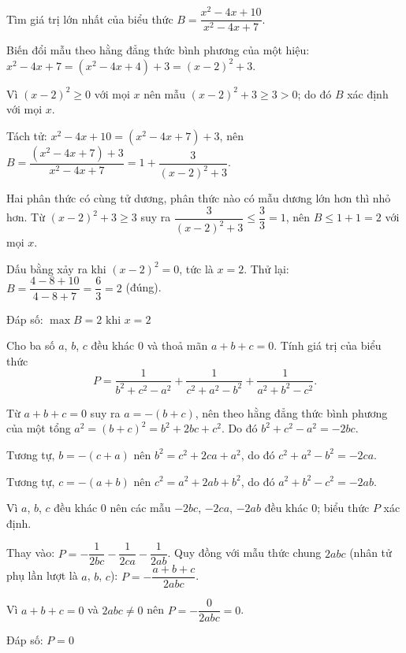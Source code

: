 \begin{problem}[8DS-PS-019]
Tìm giá trị lớn nhất của biểu thức $B = \dfrac{x^2 - 4x + 10}{x^2 - 4x + 7}$.

\begin{solution}
Biến đổi mẫu theo hằng đẳng thức bình phương của một hiệu: $x^2 - 4x + 7 = (x^2 - 4x + 4) + 3 = (x - 2)^2 + 3$.

Vì $(x - 2)^2 \geq 0$ với mọi $x$ nên mẫu $(x - 2)^2 + 3 \geq 3 > 0$; do đó $B$ xác định với mọi $x$.

Tách tử: $x^2 - 4x + 10 = (x^2 - 4x + 7) + 3$, nên $B = \dfrac{(x^2 - 4x + 7) + 3}{x^2 - 4x + 7} = 1 + \dfrac{3}{(x - 2)^2 + 3}$.

Hai phân thức có cùng tử dương, phân thức nào có mẫu dương lớn hơn thì nhỏ hơn. Từ $(x - 2)^2 + 3 \geq 3$ suy ra $\dfrac{3}{(x - 2)^2 + 3} \leq \dfrac{3}{3} = 1$, nên $B \leq 1 + 1 = 2$ với mọi $x$.

Dấu bằng xảy ra khi $(x - 2)^2 = 0$, tức là $x = 2$. Thử lại: $B = \dfrac{4 - 8 + 10}{4 - 8 + 7} = \dfrac{6}{3} = 2$ (đúng).

Đáp số: $\boxed{\max B = 2 \text{ khi } x = 2}$
\end{solution}
\end{problem}

\begin{problem}[8DS-PS-020]
Cho ba số $a$, $b$, $c$ đều khác $0$ và thoả mãn $a + b + c = 0$. Tính giá trị của biểu thức
\[ P = \dfrac{1}{b^2 + c^2 - a^2} + \dfrac{1}{c^2 + a^2 - b^2} + \dfrac{1}{a^2 + b^2 - c^2}. \]

\begin{solution}
Từ $a + b + c = 0$ suy ra $a = -(b + c)$, nên theo hằng đẳng thức bình phương của một tổng $a^2 = (b + c)^2 = b^2 + 2bc + c^2$. Do đó $b^2 + c^2 - a^2 = -2bc$.

Tương tự, $b = -(c + a)$ nên $b^2 = c^2 + 2ca + a^2$, do đó $c^2 + a^2 - b^2 = -2ca$.

Tương tự, $c = -(a + b)$ nên $c^2 = a^2 + 2ab + b^2$, do đó $a^2 + b^2 - c^2 = -2ab$.

Vì $a$, $b$, $c$ đều khác $0$ nên các mẫu $-2bc$, $-2ca$, $-2ab$ đều khác $0$; biểu thức $P$ xác định.

Thay vào: $P = -\dfrac{1}{2bc} - \dfrac{1}{2ca} - \dfrac{1}{2ab}$. Quy đồng với mẫu thức chung $2abc$ (nhân tử phụ lần lượt là $a$, $b$, $c$): $P = -\dfrac{a + b + c}{2abc}$.

Vì $a + b + c = 0$ và $2abc \neq 0$ nên $P = -\dfrac{0}{2abc} = 0$.

Đáp số: $\boxed{P = 0}$
\end{solution}
\end{problem}

